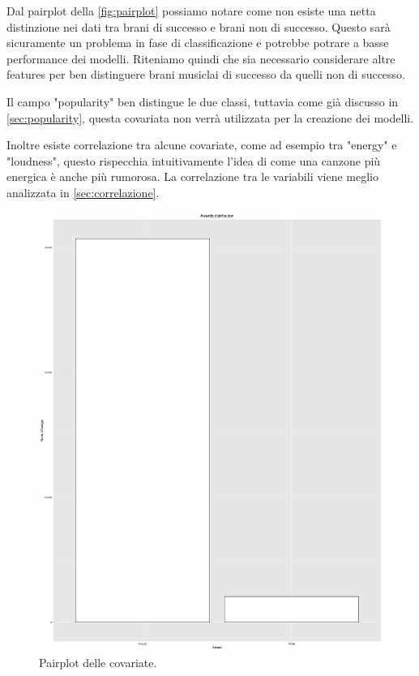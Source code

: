 Dal pairplot della \autoref{fig:pairplot} possiamo notare come non esiste una netta distinzione nei dati tra brani di successo e brani non di successo. Questo sarà sicuramente un problema in fase di classificazione e potrebbe potrare a basse performance dei modelli. Riteniamo quindi che sia necessario considerare altre features per ben distinguere brani musiclai di successo da quelli non di successo.

Il campo "popularity" ben distingue le due classi, tuttavia come già discusso in \autoref{sec:popularity}, questa covariata non verrà utilizzata per la creazione dei modelli.

Inoltre esiste correlazione tra alcune covariate, come ad esempio tra "energy" e "loudness", questo rispecchia intuitivamente l'idea di come una canzone più energica è anche più rumorosa. La correlazione tra le variabili viene meglio analizzata in \autoref{sec:correlazione}.


\begin{figure}[H]
	
	\hspace*{-1.5cm}   
	\centering
	\includegraphics[width=23cm, angle=270]{../images/pairplot.png}
	\caption{Pairplot delle covariate.}
	\label{fig:pairplot}
\end{figure}



